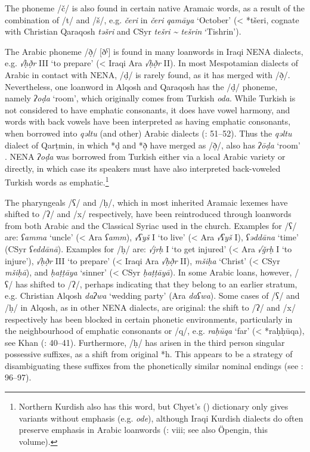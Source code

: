 \documentclass[output=paper]{langsci/langscibook}
\begin{document}
The phoneme /č/ is also found in certain native Aramaic words, as a result of the combination of /t/ and /š/, e.g. \textit{čeri} in \textit{čeri} \textit{qamāya} ‘October’ (< *tšeri, cognate with Christian Qaraqosh \textit{təšri} and CSyr \textit{tešri {\textasciitilde} tešrin} ‘Tishrin’).

The Arabic phoneme /ð̣/ [ðˁ] is found in many loanwords in Iraqi NENA dialects, e.g. \textit{√ḥð̣r} III ‘to prepare’ (< Iraqi Ara \textit{√ḥð̣r} II). In most Mespotamian dialects of Arabic in contact with NENA, /ḍ/ is rarely found, as it has merged with /ð̣/. Nevertheless, one loanword in Alqosh and Qaraqosh has the /ḍ/ phoneme, namely \textit{ʔoḍa} ‘room’, which originally comes from Turkish \textit{oda}. While Turkish is not considered to have emphatic consonants, it does have vowel harmony, and words with back vowels have been interpreted as having emphatic consonants, when borrowed into \textit{qəltu} (and other) Arabic dialects (\citealt{Jastrow1978}: 51–52). Thus the \textit{qəltu} dialect of Qarṭmin, in which *ḍ and *ð̣ have merged as /ð̣/, also has \textit{ʔōḍa} ‘room’ \citep[70]{Jastrow1978}. NENA \textit{ʔoḍa} was borrowed from Turkish either via a local Arabic variety or directly, in which case its speakers must have also interpreted back-voweled Turkish words as emphatic.\footnote{Northern Kurdish also has this word, but Chyet's (\citeyear{Chyet2003}) dictionary only gives variants without emphasis (e.g. \textit{ode}), although Iraqi Kurdish dialects do often preserve emphasis in Arabic loanwords (\citealt{Chyet2003}: viii; see also Öpengin, this volume).}

The pharyngeals /ʕ/ and /ḥ/, which in most inherited Aramaic lexemes have shifted to /ʔ/ and /x/ respectively, have been reintroduced through loanwords from both Arabic and the Classical Syriac used in the church. Examples for /ʕ/ are: \textit{ʕamma} ‘uncle’ (< Ara \textit{ʕamm}), \textit{√ʕyš} I ‘to live’ (< Ara \textit{√ʕyš} I), \textit{ʕəddāna} ‘time’ (CSyr \textit{ʕeddānā}). Examples for /ḥ/ are: \textit{√jrḥ} I ‘to get injured’ (< Ara \textit{√ǧrḥ} I ‘to injure’), \textit{√ḥð̣r} III ‘to prepare’ (< Iraqi Ara \textit{√ḥð̣r} II), \textit{mšiḥa} ‘Christ’ (< CSyr \textit{mšiḥā}), and \textit{ḥaṭṭāya} ‘sinner’ (< CSyr \textit{ḥaṭṭāyā}). In some Arabic loans, however, /ʕ/ has shifted to /ʔ/, perhaps indicating that they belong to an earlier stratum, e.g. Christian Alqosh \textit{daʔwa} ‘wedding party’ (Ara \textit{daʕwa}). Some cases of /ʕ/ and /ḥ/ in Alqosh, as in other NENA dialects, are original: the shift to /ʔ/ and /x/ respectively has been blocked in certain phonetic environments, particularly in the neighbourhood of emphatic consonants or /q/, e.g. \textit{raḥūqa} ‘far’ (< *raḥḥūqa), see Khan (\citeyear{Khan2002}: 40–41). Furthermore, /ḥ/ has arisen in the third person singular possessive suffixes, as a shift from original *h. This appears to be a strategy of disambiguating these suffixes from the phonetically similar nominal endings (see \citealt{Coghill2008}: 96–97).
\end{document}
